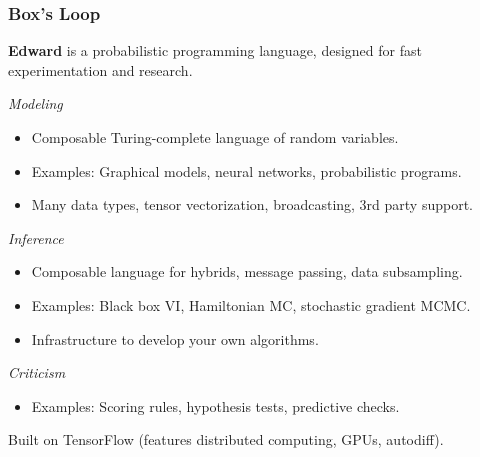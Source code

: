 \documentclass[10pt,
               xcolor={usenames,dvipsnames},
               hyperref={colorlinks,linktoc=all,citecolor=Plum,linkcolor=MidnightBlue,urlcolor=MidnightBlue},noamssymb]{beamer}
\begin{document}
\begin{frame}
\frametitle{Box's Loop}
\end{frame}

\begin{frame}
\vspace{3ex}
\textbf{Edward} is a probabilistic programming language,
designed for fast experimentation and research.

\emph{Modeling}
\begin{itemize}
\item
Composable Turing-complete language of random variables.
\item
Examples:
Graphical models, neural networks, probabilistic programs.
\item
Many data types, tensor vectorization, broadcasting, 3rd party support.
\end{itemize}

\emph{Inference}
\begin{itemize}
\item
Composable language for hybrids, message passing, data subsampling.
\item
Examples:
Black box VI, Hamiltonian MC, stochastic
gradient MCMC.
\item
Infrastructure to develop your own algorithms.
\end{itemize}

\emph{Criticism}
\begin{itemize}
\item
Examples: Scoring rules, hypothesis tests, predictive checks.
\end{itemize}

\vspace{1ex}
Built on TensorFlow (features distributed computing, GPUs, autodiff).

\end{frame}
\end{document}
